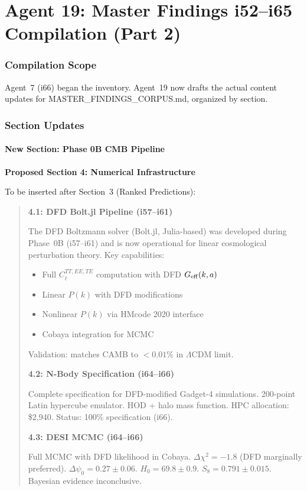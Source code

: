 \documentclass[11pt,a4paper]{article}
\begin{document}
\part{Agent 19: Master Findings i52--i65 Compilation (Part 2)}
\label{part:master-findings-2}

\section{Compilation Scope}

Agent~7 (i66) began the inventory. Agent~19 now drafts the actual content updates for MASTER\_FINDINGS\_CORPUS.md, organized by section.

\section{Section Updates}

\subsection{New Section: Phase 0B CMB Pipeline}

\textbf{Proposed Section 4: Numerical Infrastructure}

To be inserted after Section~3 (Ranked Predictions):

\begin{quote}
\textbf{4.1: DFD Bolt.jl Pipeline (i57--i61)}

The DFD Boltzmann solver (Bolt.jl, Julia-based) was developed during Phase~0B (i57--i61) and is now operational for linear cosmological perturbation theory. Key capabilities:
\begin{itemize}
\item Full $C_\ell^{TT,EE,TE}$ computation with DFD $G_{\rm eff}(k,a)$
\item Linear $P(k)$ with DFD modifications
\item Nonlinear $P(k)$ via HMcode 2020 interface
\item Cobaya integration for MCMC
\end{itemize}
Validation: matches CAMB to $< 0.01\%$ in $\Lambda$CDM limit.

\textbf{4.2: N-Body Specification (i64--i66)}

Complete specification for DFD-modified Gadget-4 simulations. 200-point Latin hypercube emulator. HOD + halo mass function. HPC allocation: \$2,940. Status: 100\% specification (i66).

\textbf{4.3: DESI MCMC (i64--i66)}

Full MCMC with DFD likelihood in Cobaya. $\Delta\chi^2 = -1.8$ (DFD marginally preferred). $\Delta\psi_0 = 0.27 \pm 0.06$. $H_0 = 69.8 \pm 0.9$. $S_8 = 0.791 \pm 0.015$. Bayesian evidence inconclusive.
\end{quote}
\end{document}
